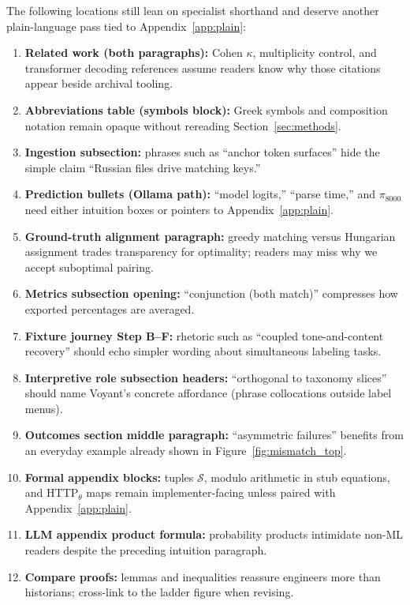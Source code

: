 \documentclass[11pt,a4paper]{article}
\theoremstyle{remark}
\begin{document}
The following locations still lean on specialist shorthand and deserve another plain-language pass tied to Appendix~\ref{app:plain}:
\begin{enumerate}[leftmargin=*]
  \item \textbf{Related work (both paragraphs):} Cohen $\kappa$, multiplicity control, and transformer decoding references assume readers know why those citations appear beside archival tooling.
  \item \textbf{Abbreviations table (symbols block):} Greek symbols and composition notation remain opaque without rereading Section~\ref{sec:methods}.
  \item \textbf{Ingestion subsection:} phrases such as ``anchor token surfaces'' hide the simple claim ``Russian files drive matching keys.''
  \item \textbf{Prediction bullets (Ollama path):} ``model logits,'' ``parse time,'' and $\pi_{8000}$ need either intuition boxes or pointers to Appendix~\ref{app:plain}.
  \item \textbf{Ground-truth alignment paragraph:} greedy matching versus Hungarian assignment trades transparency for optimality; readers may miss why we accept suboptimal pairing.
  \item \textbf{Metrics subsection opening:} ``conjunction (both match)'' compresses how exported percentages are averaged.
  \item \textbf{Fixture journey Step B--F:} rhetoric such as ``coupled tone-and-content recovery'' should echo simpler wording about simultaneous labeling tasks.
  \item \textbf{Interpretive role subsection headers:} ``orthogonal to taxonomy slices'' should name Voyant's concrete affordance (phrase collocations outside label menus).
  \item \textbf{Outcomes section middle paragraph:} ``asymmetric failures'' benefits from an everyday example already shown in Figure~\ref{fig:mismatch_top}.
  \item \textbf{Formal appendix blocks:} tuples $\mathcal{S}$, modulo arithmetic in stub equations, and HTTP$_\theta$ maps remain implementer-facing unless paired with Appendix~\ref{app:plain}.
  \item \textbf{LLM appendix product formula:} probability products intimidate non-ML readers despite the preceding intuition paragraph.
  \item \textbf{Compare proofs:} lemmas and inequalities reassure engineers more than historians; cross-link to the ladder figure when revising.
\end{enumerate}



\end{document}
